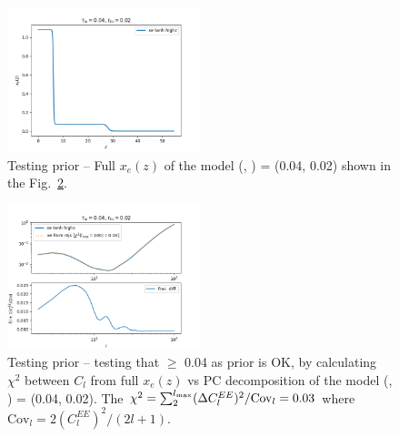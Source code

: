 \documentclass[prd,twocolumn,amsmath,amssymb,floatfix,superscriptaddress,nofootinbib]{revtex4-1}
\begin{document}
\begin{figure}
\includegraphics[width=0.5\textwidth]{results/cosmomc_kde/taulo_prior_test/plot_xez_taulo_0p04_tauhi_0p02.png}
\caption{Testing \taulo prior -- Full $x_e(z)$ of the model (\taulo, \tauhi) = (0.04, 0.02) shown in the Fig.~\ref{fig:taulo_prior_test_cl}. 
}
\label{fig:two_step_model}
\end{figure}

\begin{figure}
\includegraphics[width=0.5\textwidth]{results/cosmomc_kde/taulo_prior_test/plot_cls_taulo_0p04_tauhi_0p02.png}
\caption{Testing \taulo prior -- testing that \taulo $\geq$ 0.04 as \taulo prior is OK, by calculating $\chi^2$ between $C_l$ from full $x_e(z)$ vs PC decomposition of the model (\taulo, \tauhi) = (0.04, 0.02). 
The $\chi^2 = \sum_{2}^{l_{\rm max}} (\Delta C_l^{EE})^2 / \mathrm{Cov}_l = 0.03$ where $\mathrm{Cov}_l = 2 (C_l^{EE})^2/(2l+1)$. } 
\label{fig:taulo_prior_test_cl}
\end{figure}
\end{document}
